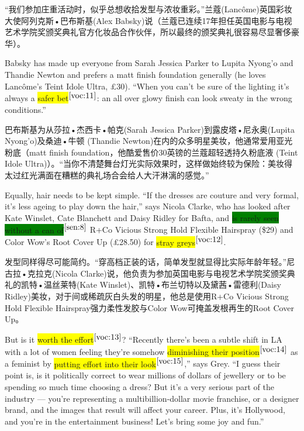 \documentclass[UTF8]{ctexart}
\begin{document}
“我们参加庄重活动时，似乎总想收拾发型与浓妆重彩。”兰蔻(Lancôme)英国彩妆大使阿列克斯•巴布斯基(Alex Babsky)说（兰蔻已连续17年担任英国电影与电视艺术学院奖颁奖典礼官方化妆品合作伙伴，所以最终的颁奖典礼很容易尽显奢侈豪华）。

Babsky has made up everyone from Sarah Jessica Parker to Lupita Nyong’o and Thandie Newton and prefers a matt finish foundation generally (he loves Lancôme’s Teint Idole Ultra, £30). “When you can’t be sure of the lighting it’s always a \colorbox{yellow}{safer bet}$^{\ref{voc:11}}$: an all over glowy finish can look sweaty in the wrong conditions.”

巴布斯基为从莎拉•杰西卡•帕克(Sarah Jessica Parker)到露皮塔•尼永奥(Lupita Nyong'o)及桑迪•牛顿 (Thandie Newton)在内的众多明星美妆，他通常爱用亚光粉底（matt finish foundation，他酷爱售价30英镑的兰蔻超轻透持久粉底液 (Teint Idole Ultra)）。“当你不清楚舞台灯光实际效果时，这样做始终较为保险：美妆得太过红光满面在糟糕的典礼场合会给人大汗淋漓的感觉。”

Equally, hair needs to be kept simple. “If the dresses are couture and very formal, it’s less ageing to play down the hair,” says Nicola Clarke, who has looked after Kate Winslet, Cate Blanchett and Daisy Ridley for Bafta, and \colorbox{green}{is rarely seen without a can of}$^{\ref{sen:8}}$ R+Co Vicious Strong Hold Flexible Hairspray (\$29) and Color Wow’s Root Cover Up (£28.50) for \colorbox{yellow}{stray greys}$^{\ref{voc:12}}$.

发型同样得尽可能简约。“穿高档正装的话，简单发型就显得比实际年龄年轻。”尼古拉•克拉克(Nicola Clarke)说，他负责为参加英国电影与电视艺术学院奖颁奖典礼的凯特•温丝莱特(Kate Winslet)、凯特•布兰切特以及黛茜•雷德利(Daisy Ridley)美妆，对于间或稀疏灰白头发的明星，他总是使用R+Co Vicious Strong Hold Flexible Hairspray强力柔性发胶与Color Wow可掩盖发根再生的Root Cover Up。

But is it \colorbox{yellow}{worth the effort}$^{\ref{voc:13}}$? “Recently there’s been a subtle shift in LA with a lot of women feeling they’re somehow \colorbox{yellow}{diminishing their position}$^{\ref{voc:14}}$ as a feminist by \colorbox{yellow}{putting effort into their look}$^{\ref{voc:15}}$,” says Grey. “I guess their point is, is it politically correct to wear millions of dollars of jewellery or to be spending so much time choosing a dress? But it’s a very serious part of the industry — you’re representing a multibillion-dollar movie franchise, or a designer brand, and the images that result will affect your career. Plus, it’s Hollywood, and you’re in the entertainment business! Let’s bring some joy and fun.”
\end{document}
